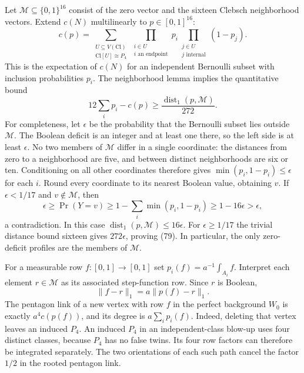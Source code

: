 Let $\mathcal M\subseteq\{0,1\}^{16}$ consist of the zero vector and
the sixteen Clebsch neighborhood vectors. Extend $c(N)$ multilinearly
to $p\in[0,1]^{16}$:
\[
 c(p)=\sum_{\substack{U\subseteq V(\mathrm{Cl})\\
                      \mathrm{Cl}[U]\cong P_4}}
       \prod_{\substack{i\in U\\i\text{ an endpoint}}}p_i
       \prod_{\substack{j\in U\\j\text{ internal}}}(1-p_j).
\]
This is the expectation of $c(N)$ for an independent Bernoulli subset
with inclusion probabilities $p_i$. The neighborhood lemma implies
the quantitative bound
\begin{equation}\tag{79}\label{eq:fractional-profile-distance}
 12\sum_i p_i-c(p)\geq\frac{\operatorname{dist}_1(p,\mathcal M)}{272}.
\end{equation}
For completeness, let $\epsilon$ be the probability that the Bernoulli
subset lies outside $\mathcal M$. The Boolean deficit is an integer
and at least one there, so the left side is at least $\epsilon$. No
two members of $\mathcal M$ differ in a single coordinate: the
distances from zero to a neighborhood are five, and between distinct
neighborhoods are six or ten. Conditioning on all other coordinates
therefore gives $\min(p_i,1-p_i)\leq\epsilon$ for each $i$. Round
every coordinate to its nearest Boolean value, obtaining $v$. If
$\epsilon<1/17$ and $v\notin\mathcal M$, then
\[
 \epsilon\geq\Pr(Y=v)
 \geq1-\sum_i\min(p_i,1-p_i)\geq1-16\epsilon>\epsilon,
\]
a contradiction. In this case
$\operatorname{dist}_1(p,\mathcal M)\leq16\epsilon$. For
$\epsilon\geq1/17$ the trivial distance bound sixteen gives
$272\epsilon$, proving (79). In particular, the only zero-deficit
profiles are the members of $\mathcal M$.

For a measurable row $f:[0,1]\to[0,1]$ set
$p_i(f)=a^{-1}\int_{A_i}f$. Interpret each element $r\in\mathcal M$
as its associated step-function row. Since $r$ is Boolean,
\begin{equation}\tag{80}\label{eq:row-profile-distance}
 \lVert f-r\rVert_1=a\lVert p(f)-r\rVert_1.
\end{equation}
The pentagon link of a new vertex with row $f$ in the perfect
background $W_0$ is exactly $a^4c(p(f))$, and its degree is
$a\sum_i p_i(f)$. Indeed, deleting that vertex leaves an induced
$P_4$. An induced $P_4$ in an independent-class blow-up uses four
distinct classes, because $P_4$ has no false twins. Its four row
factors can therefore be integrated separately. The two orientations
of each such path cancel the factor $1/2$ in the rooted pentagon link.

